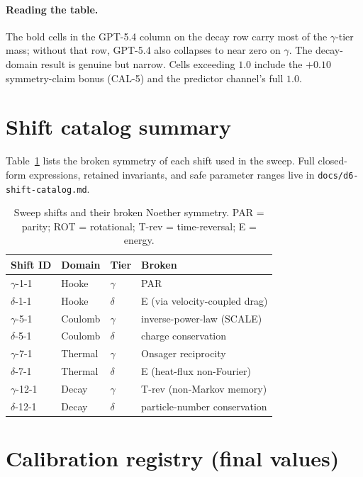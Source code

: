 \paragraph{Reading the table.} The bold cells in the GPT-5.4 column on
the decay row carry most of the $\gamma$-tier mass; without that row,
GPT-5.4 also collapses to near zero on $\gamma$. The decay-domain
result is genuine but narrow. Cells exceeding $1.0$ include the
$+0.10$ symmetry-claim bonus (CAL-5) and the predictor channel's full
$1.0$.

\section{Shift catalog summary}
\label{app:catalog}

Table~\ref{tab:catalog} lists the broken symmetry of each shift used in
the sweep. Full closed-form expressions, retained invariants, and safe
parameter ranges live in \texttt{docs/d6-shift-catalog.md}.

\begin{table}[h]
\centering
\small
\caption{Sweep shifts and their broken Noether symmetry. PAR = parity;
ROT = rotational; T-rev = time-reversal; E = energy.}
\label{tab:catalog}
\begin{tabular}{llll}
\toprule
Shift ID & Domain & Tier & Broken \\
\midrule
$\gamma$-1-1  & Hooke    & $\gamma$ & PAR  \\
$\delta$-1-1  & Hooke    & $\delta$ & E (via velocity-coupled drag) \\
$\gamma$-5-1  & Coulomb  & $\gamma$ & inverse-power-law (SCALE) \\
$\delta$-5-1  & Coulomb  & $\delta$ & charge conservation \\
$\gamma$-7-1  & Thermal  & $\gamma$ & Onsager reciprocity \\
$\delta$-7-1  & Thermal  & $\delta$ & E (heat-flux non-Fourier) \\
$\gamma$-12-1 & Decay    & $\gamma$ & T-rev (non-Markov memory) \\
$\delta$-12-1 & Decay    & $\delta$ & particle-number conservation \\
\bottomrule
\end{tabular}
\end{table}

\section{Calibration registry (final values)}
\label{app:cal}


